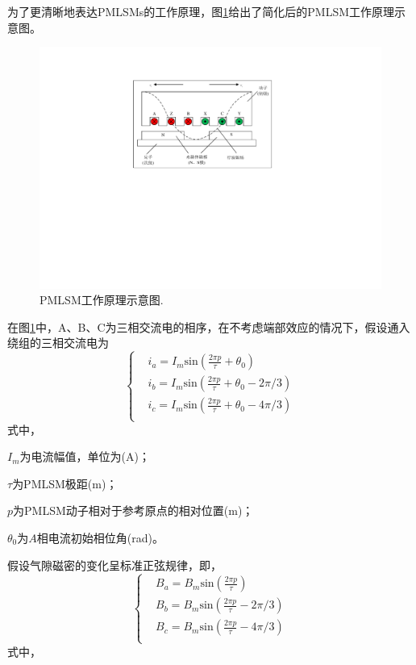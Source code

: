 为了更清晰地表达PMLSMs的工作原理，图\ref{PMLSM工作原理}给出了简化后的PMLSM工作原理示意图。
\begin{figure}[!t]
	\centering
	\includegraphics[width=12cm]{figures/PMLSM工作原理示意图.pdf}
	\caption{PMLSM工作原理示意图.}
	\label{PMLSM工作原理}
\end{figure}

在图\ref{PMLSM工作原理}中，A、B、C为三相交流电的相序，在不考虑端部效应的情况下，假设通入绕组的三相交流电为
\begin{equation}
\left\{\begin{aligned}
&i_a=I_m\text{sin}(\frac{2\pi p}{\tau}+\theta_0)\\ 
&i_b=I_m\text{sin}(\frac{2\pi p}{\tau}+\theta_0-2\pi/3)\\ 
&i_c=I_m\text{sin}(\frac{2\pi p}{\tau}+\theta_0-4\pi/3)\\
\end{aligned}\right.
\end{equation}
式中，

$I_m$为电流幅值，单位为(A)；

$\tau$为PMLSM极距($\text{m}$)；

$p$为PMLSM动子相对于参考原点的相对位置($\text{m}$)；

$\theta_0$为$A$相电流初始相位角(rad)。

假设气隙磁密的变化呈标准正弦规律，即，
\begin{equation}
\left\{\begin{aligned}
&B_a=B_m\text{sin}(\frac{2\pi p}{\tau})\\ 
&B_b=B_m\text{sin}(\frac{2\pi p}{\tau}-2\pi/3)\\ 
&B_c=B_m\text{sin}(\frac{2\pi p}{\tau}-4\pi/3)\\
\end{aligned}\right.
\end{equation}
式中，

